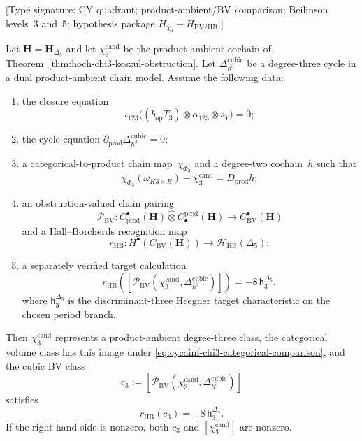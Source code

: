\begin{proposition}
\label{prop:cycainf-chi-3-c-3-correspondence}
\textup{[Type signature: CY quadrant; product-ambient/BV comparison;
Beilinson levels~$3$ and~$5$; hypothesis package
$H_{\chi_3}+H_{\mathrm{BV/HB}}$.]}

Let $\mathbf H=\mathbf H_{\Delta_5}$ and let
$\chi_3^{\mathrm{cand}}$ be the product-ambient cochain of
Theorem~\ref{thm:hoch-chi3-koszul-obstruction}. Let
$\Delta^{\mathrm{cubic}}_{\hbar^3}$ be a degree-three cycle in a dual
product-ambient chain model. Assume the following data:
\begin{enumerate}[label=\textup{(\roman*)}]
\item the closure equation
\begin{equation}
\label{eq:cycainf-chi3-closure}
 \iota_{123}\bigl((b_{\mathrm{op}}T_3)\otimes
 \alpha_{123}\otimes s_Y\bigr)=0;
\end{equation}
\item the cycle equation
$\partial_{\mathrm{prod}}
\Delta^{\mathrm{cubic}}_{\hbar^3}=0$;
\item a categorical-to-product chain map~$\chi_{\Phi_3}$ and a
degree-two cochain~$h$ such that
\begin{equation}
\label{eq:cycainf-chi3-categorical-comparison}
 \chi_{\Phi_3}(\omega_{K3\times E})-
 \chi_3^{\mathrm{cand}}=D_{\mathrm{prod}}h;
\end{equation}
\item an obstruction-valued chain pairing
\[
 \mathcal P_{\mathrm{BV}}\colon
 C^\bullet_{\mathrm{prod}}(\mathbf H)
 \widehat\otimes C^{\mathrm{prod}}_\bullet(\mathbf H)
 \longrightarrow C^\bullet_{\mathrm{BV}}(\mathbf H)
\]
and a Hall--Borcherds recognition map
\[
 r_{\mathrm{HB}}\colon H^\bullet(C_{\mathrm{BV}}(\mathbf H))
 \longrightarrow \mathcal H_{\mathrm{HB}}(\Delta_5);
\]
\item a separately verified target calculation
\begin{equation}
\label{eq:cycainf-hb-target-calculation}
 r_{\mathrm{HB}}\!\left(
 [\mathcal P_{\mathrm{BV}}(\chi_3^{\mathrm{cand}},
 \Delta^{\mathrm{cubic}}_{\hbar^3})]\right)
 =-8\,\mathsf h^{\Delta_5}_3,
\end{equation}
where $\mathsf h^{\Delta_5}_3$ is the discriminant-three Heegner
target characteristic on the chosen period branch.
\end{enumerate}
Then $\chi_3^{\mathrm{cand}}$ represents a product-ambient
degree-three class, the categorical volume class has this image under
\eqref{eq:cycainf-chi3-categorical-comparison}, and the cubic BV class
\begin{equation}
\label{eq:cycainf-c-3-formula}
 c_3:=
 [\mathcal P_{\mathrm{BV}}(\chi_3^{\mathrm{cand}},
 \Delta^{\mathrm{cubic}}_{\hbar^3})]
\end{equation}
satisfies
\begin{equation}
\label{eq:cycainf-chi-3-c-3-pairing}
 r_{\mathrm{HB}}(c_3)=-8\,\mathsf h^{\Delta_5}_3.
\end{equation}
If the right-hand side is nonzero, both $c_3$ and
$[\chi_3^{\mathrm{cand}}]$ are nonzero.
\end{proposition}

